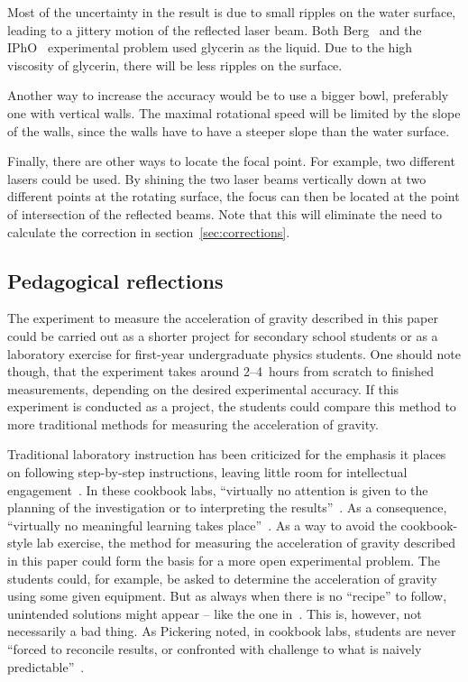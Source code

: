 \documentclass[12pt, a4paper, twocolumn]{article}
\begin{document}
Most of the uncertainty in the result is due to small ripples on the water surface, leading to a jittery motion of the reflected laser beam. Both Berg~\cite{Berg1990} and the IPhO~\cite{IPhO2001} experimental problem used glycerin as the liquid. Due to the high viscosity of glycerin, there will be less ripples on the surface.

Another way to increase the accuracy would be to use a bigger bowl, preferably one with vertical walls. The maximal rotational speed will be limited by the slope of the walls, since the walls have to have a steeper slope than the water surface.

Finally, there are other ways to locate the focal point. For example, two different lasers could be used. By shining the two laser beams vertically down at two different points at the rotating surface, the focus can then be located at the point of intersection of the reflected beams. Note that this will eliminate the need to calculate the correction in section~\ref{sec:corrections}. 

\subsection{Pedagogical reflections}

The experiment to measure the acceleration of gravity described in
this paper could be carried out as a shorter project for secondary
school students or as a laboratory exercise for first-year
undergraduate physics students. One should note though, that the
experiment takes around 2--4~hours from scratch to finished
measurements, depending on the desired experimental accuracy. If this
experiment is conducted as a project, the students could compare this
method to more traditional methods for measuring the acceleration of
gravity.

Traditional laboratory instruction has been criticized for the
emphasis it places on following step-by-step instructions, leaving
little room for intellectual engagement~\cite{Domin1999}. In these
cookbook labs, ``virtually no attention is given to the planning of
the investigation or to interpreting the
results''~\cite{Domin1999}. As a consequence, ``virtually no
meaningful learning takes place''~\cite{Domin1999}. As a way to avoid
the cookbook-style lab exercise, the method for measuring the
acceleration of gravity described in this paper could form the basis
for a more open experimental problem. The students could, for example,
be asked to determine the acceleration of gravity using some given
equipment. But as always when there is no ``recipe'' to follow,
unintended solutions might appear – like the one
in~\cite{IPhO2001}. This is, however, not necessarily a bad thing. As
Pickering noted, in cookbook labs, students are never ``forced to
reconcile results, or confronted with challenge to what is naively
predictable''~\cite{Pickering1987}.
\end{document}
